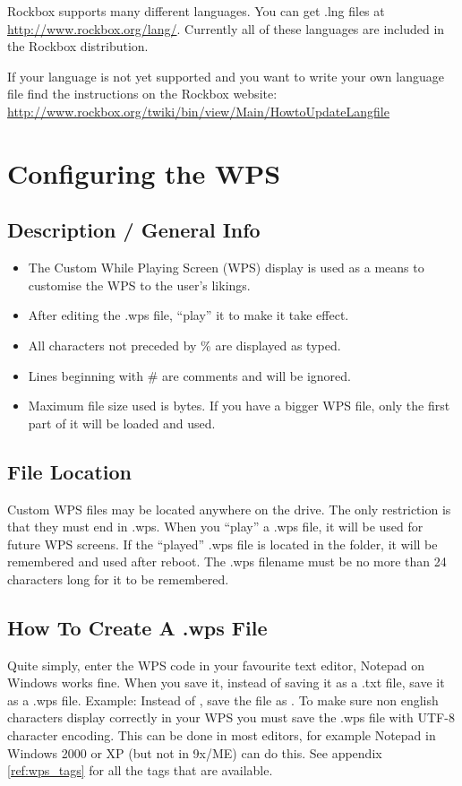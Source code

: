 Rockbox supports many different languages. You can get .lng files at
\url{http://www.rockbox.org/lang/}.
Currently all of these languages are included in the Rockbox distribution.

If your language is not yet supported and you want to write your own language
file find the instructions on the Rockbox website:
\url{http://www.rockbox.org/twiki/bin/view/Main/HowtoUpdateLangfile}

\section{\label{ref:ConfiguringtheWPS}Configuring the WPS}

\subsection{Description / General Info}

\begin{itemize}
\item The Custom While Playing Screen (WPS) display is used as a means to customise the WPS to the user's likings.
\item After editing the .wps file, ``play'' it to make it take effect.
\item All characters not preceded by \% are displayed as typed.
\item Lines beginning with \# are comments and will be ignored.
\item Maximum file size used is 
bytes. If you have a bigger WPS file, only the first part of it will be loaded and used.
\end{itemize}

\subsection{File Location}
Custom WPS files may be located anywhere on the drive. The only restriction is
that they must end in .wps. When you ``play'' a .wps file, it will be used for
future WPS screens. If the ``played'' .wps file is located in the
 folder, it will be remembered and used after reboot. 
The .wps filename must be no more than 24 characters long for it to be
remembered.

\subsection{How To Create A .wps File}
Quite simply, enter the WPS code in your favourite text editor, Notepad on
Windows works fine. When you save it, instead of saving it as a .txt file, save
it as a .wps file. Example: Instead of , save the file as
. To make sure non english characters display correctly in
your WPS you must save the .wps file with UTF-8 character encoding. This can be
done in most editors, for example Notepad in Windows 2000 or XP (but not in
9x/ME) can do this. See appendix \ref{ref:wps_tags} for all the tags that are
available.

